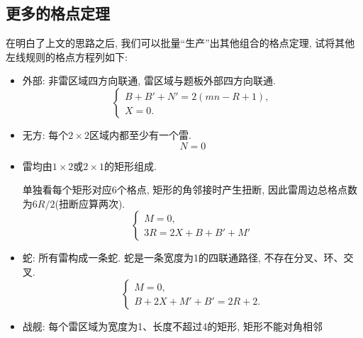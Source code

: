 \documentclass{ctexart}
\newcommand{\varible}[1]{{\Noto[#1]}}
\begin{document}
\subsection{更多的格点定理}
在明白了上文的思路之后, 我们可以批量``生产''出其他组合的格点定理, 试将其他左线规则的格点方程列如下:

\begin{itemize}
    \item \varible{O}{\heiti 外部: 非雷区域四方向联通, 雷区域与题板外部四方向联通.}
        $$
        \begin{cases}
            B + B' + N' = 2(mn - R + 1),\\
            X = 0.
        \end{cases}
        $$
    \item \varible{Q}{\heiti 无方: 每个$2\times2$区域内都至少有一个雷.}
        $$
        N = 0
        $$
    \item \varible{D}{\heiti 雷均由$1\times2$或$2\times1$的矩形组成.}
    
    单独看每个矩形对应6个格点, 矩形的角邻接时产生扭断, 因此雷周边总格点数为$6R/2$(扭断应算两次).
        $$
        \begin{cases}
            M = 0,\\
            3R = 2X + B + B' + M'
        \end{cases}
        $$
    \item \varible{S} {\heiti 蛇: 所有雷构成一条蛇. 蛇是一条宽度为1的四联通路径, 不存在分叉、环、交叉.}
        $$
        \begin{cases}
            M = 0,\\
            B + 2X + M' + B' = 2R + 2.
        \end{cases}
        $$
    \item \varible{D'} {\heiti 战舰: 每个雷区域为宽度为1、长度不超过4的矩形, 矩形不能对角相邻}
    

\end{itemize}
\end{document}
